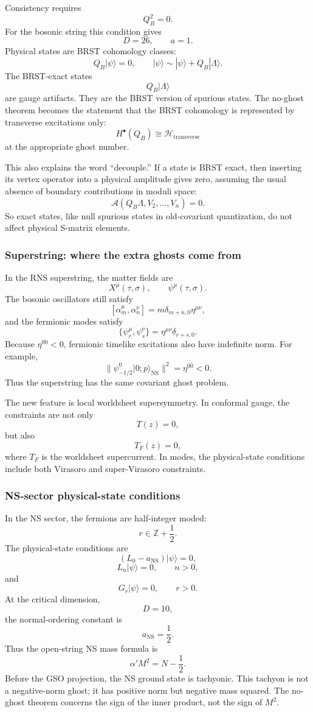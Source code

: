 \documentclass[
  10pt,
  a4paper,
  openany]{book}
\begin{document}
Consistency requires \[
Q_B^2=0.
\] For the bosonic string this condition gives \[
D=26,
\qquad
a=1.
\] Physical states are BRST cohomology classes: \[
Q_B|\psi\rangle=0,
\qquad
|\psi\rangle\sim|\psi\rangle+Q_B|\Lambda\rangle.
\] The BRST-exact states \[
Q_B|\Lambda\rangle
\] are gauge artifacts. They are the BRST version of spurious states.
The no-ghost theorem becomes the statement that the BRST cohomology is
represented by transverse excitations only: \[
H^\bullet(Q_B)
\cong
\mathcal H_{\text{transverse}}
\] at the appropriate ghost number.

This also explains the word ``decouple.'' If a state is BRST exact, then
inserting its vertex operator into a physical amplitude gives zero,
assuming the usual absence of boundary contributions in moduli space: \[
\mathcal A(Q_B\Lambda,V_2,\dots,V_n)=0.
\] So exact states, like null spurious states in old-covariant
quantization, do not affect physical S-matrix elements.

\subsubsection{Superstring: where the extra ghosts come
from}\label{superstring-where-the-extra-ghosts-come-from}

In the RNS superstring, the matter fields are \[
X^\mu(\tau,\sigma),
\qquad
\psi^\mu(\tau,\sigma).
\] The bosonic oscillators still satisfy \[
[\alpha_m^\mu,\alpha_n^\nu]
=
m\delta_{m+n,0}\eta^{\mu\nu},
\] and the fermionic modes satisfy \[
\{\psi_r^\mu,\psi_s^\nu\}
=
\eta^{\mu\nu}\delta_{r+s,0}.
\] Because \(\eta^{00}<0\), fermionic timelike excitations also have
indefinite norm. For example, \[
\|\psi_{-1/2}^0|0;p\rangle_{\text{NS}}\|^2
=
\eta^{00}
<0.
\] Thus the superstring has the same covariant ghost problem.

The new feature is local worldsheet supersymmetry. In conformal gauge,
the constraints are not only \[
T(z)=0,
\] but also \[
T_F(z)=0,
\] where \(T_F\) is the worldsheet supercurrent. In modes, the
physical-state conditions include both Virasoro and super-Virasoro
constraints.

\subsubsection{NS-sector physical-state
conditions}\label{ns-sector-physical-state-conditions}

In the NS sector, the fermions are half-integer moded: \[
r\in\mathbb Z+\frac{1}{2}.
\] The physical-state conditions are \[
(L_0-a_{\text{NS}})|\psi\rangle=0,
\] \[
L_n|\psi\rangle=0,
\qquad
n>0,
\] and \[
G_r|\psi\rangle=0,
\qquad
r>0.
\] At the critical dimension, \[
D=10,
\] the normal-ordering constant is \[
a_{\text{NS}}=\frac{1}{2}.
\] Thus the open-string NS mass formula is \[
\alpha' M^2
=
N-\frac{1}{2}.
\] Before the GSO projection, the NS ground state is tachyonic. This
tachyon is not a negative-norm ghost; it has positive norm but negative
mass squared. The no-ghost theorem concerns the sign of the inner
product, not the sign of \(M^2\).
\end{document}
